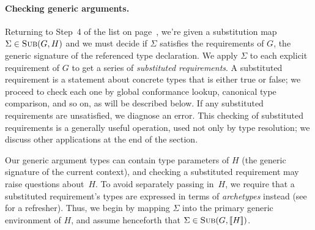 \documentclass[../generics]{subfiles}
\begin{document}
\paragraph{Checking generic arguments.}
Returning to Step~4 of the list on page~\pageref{label:type parameter base}, we're given a substitution map $\Sigma\in\textsc{Sub}({G, H})$ and we must decide if $\Sigma$ satisfies the requirements of $G$, the generic signature of the referenced type declaration. We apply $\Sigma$ to each explicit requirement of $G$ to get a series of \emph{substituted requirements}. A substituted requirement is a statement about concrete types that is either true or false; we proceed to check each one by global conformance lookup, canonical type comparison, and so on, as will be described below. If any substituted requirements are unsatisfied, we diagnose an error. This checking of substituted requirements is a generally useful operation, used not only by type resolution; we discuss other applications at the end of the section.

Our generic argument types can contain type parameters of $H$ (the generic signature of the current context), and checking a substituted requirement may raise questions about~$H$. To avoid separately passing in~$H$, we require that a substituted requirement's types are expressed in terms of \emph{archetypes} instead (see  for a refresher). Thus, we begin by mapping $\Sigma$ into the primary generic environment of $H$, and assume henceforth that $\Sigma\in\textsc{Sub}({G, [\![H]\!]})$.
\end{document}
